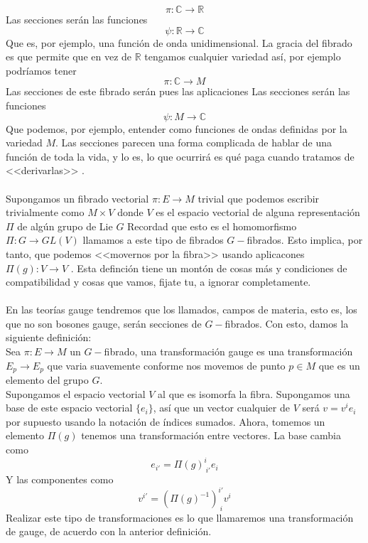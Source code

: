 \documentclass[12pt]{article}
\begin{document}
\begin{equation}
    \pi:  {\mathbb{C}} \rightarrow\mathbb{R} 
\end{equation}
Las secciones serán las funciones 
$$\psi: \mathbb{R}\rightarrow \mathbb{C}$$
Que es, por ejemplo, una función de onda unidimensional. La gracia del fibrado es que permite que en vez de $\mathbb{R}$ tengamos cualquier variedad así, por ejemplo podríamos tener 
\begin{equation}
    \pi:  {\mathbb{C}} \rightarrow M 
\end{equation}
Las secciones de este fibrado serán pues las aplicaciones 
Las secciones serán las funciones 
$$\psi: M\rightarrow \mathbb{C}$$
Que podemos, por ejemplo, entender como funciones de ondas definidas por la variedad $M$. Las secciones parecen una forma complicada de hablar de una función de toda la vida, y lo es, lo que ocurrirá es qué paga cuando tratamos de <<derivarlas>> .\\\\
Supongamos un fibrado vectorial $\pi : E\rightarrow M$ trivial que podemos escribir trivialmente como $M\times V$ donde $V$ es el espacio vectorial de alguna representación $\Pi$ de algún grupo de Lie $G$ Recordad que esto es el homomorfismo $\Pi: G\rightarrow GL(V)$ llamamos a este tipo de fibrados $G-$fibrados. Esto implica, por tanto, que podemos <<movernos por la fibra>> usando aplicacones $\Pi(g): V \rightarrow V$ . Esta definción tiene un montón de cosas más y condiciones de compatibilidad y cosas que vamos, fijate tu, a ignorar completamente. \\\\ En las teorías gauge tendremos que los llamados, campos de materia, esto es, los que no son bosones gauge, serán secciones de $G-$fibrados.  
Con esto, damos la siguiente definición:\\
Sea $\pi: E\rightarrow M$ un $G-$fibrado, una transformación gauge es una transformación  $E_p\rightarrow E_p$ que varia suavemente conforme nos movemos de punto $p \in M$  que es un elemento del grupo $G$. \\   
Supongamos el espacio vectorial $V$ al que es isomorfa la fibra. Supongamos una base de este espacio vectorial $\{e_i\}$, así que un vector cualquier de $V$ será $v=v^ie_i$ por supuesto usando la notación de índices sumados. Ahora, tomemos un elemento $\Pi (g)$ tenemos una transformación entre vectores. La base cambia como
$$ e_{i'}=\Pi(g)^{i}_{\ i'} e_{i}$$
Y las componentes como
$$ v^{i'}=(\Pi(g)^{-1})^{i'}_{\ i} v^{i}$$
Realizar este tipo de transformaciones es lo que llamaremos una transformación de gauge, de acuerdo con la anterior definición. \\\
\end{document}
